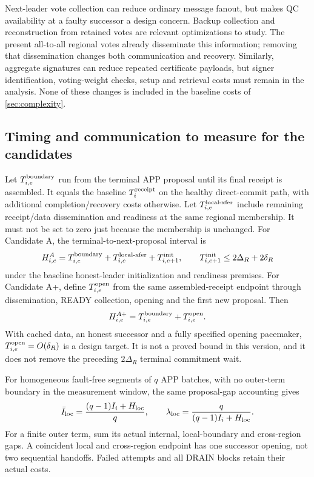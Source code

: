 Next-leader vote collection can reduce ordinary message fanout, but makes
QC availability at a faulty successor a design concern. Backup collection
and reconstruction from retained votes are relevant optimizations to study.
The present all-to-all regional votes already disseminate this information;
removing that dissemination changes both communication and recovery.
Similarly, aggregate signatures can reduce repeated certificate payloads,
but signer identification, voting-weight checks, setup and retrieval costs
must remain in the analysis. None of these changes is included in the
baseline costs of \cref{sec:complexity}.

\subsection{Timing and communication to measure for the candidates}
Let $T_{i,e}^{\rm boundary}$ run from the terminal APP proposal until its
final receipt is assembled. It equals the baseline $T_i^{\rm receipt}$ on
the healthy direct-commit path, with additional completion/recovery costs
otherwise. Let $T_{i,e}^{\rm local\text{-}xfer}$ include remaining receipt/data
dissemination and readiness at the same regional membership. It must not
be set to zero just because the membership is unchanged. For Candidate A,
the terminal-to-next-proposal interval is
\[
 H_{i,e}^{A}=T_{i,e}^{\rm boundary}
            +T_{i,e}^{\rm local\text{-}xfer}+T_{i,e+1}^{\rm init},
 \qquad T_{i,e+1}^{\rm init}\leq2\Delta_R+2\delta_R
\]
under the baseline honest-leader initialization and readiness premises.
For Candidate A+, define $T_{i,e}^{\rm open}$ from the same assembled-receipt
endpoint through dissemination, READY collection, opening and the first
new proposal. Then
\[
 H_{i,e}^{A+}=T_{i,e}^{\rm boundary}+T_{i,e}^{\rm open}.
\]
With cached data, an honest successor and a fully specified opening
pacemaker, $T_{i,e}^{\rm open}=O(\delta_R)$ is a design target. It is not a
proved bound in this version, and it does not remove the preceding
$2\Delta_R$ terminal commitment wait.

For homogeneous fault-free segments of $q$ APP batches, with no outer-term
boundary in the measurement window, the same proposal-gap accounting gives
\[
 \bar I_{\rm loc}=\frac{(q-1)I_i+H_{\rm loc}}{q},\qquad
 \lambda_{\rm loc}=\frac{q}{(q-1)I_i+H_{\rm loc}}.
\]
For a finite outer term, sum its actual internal, local-boundary and
cross-region gaps. A coincident local and cross-region endpoint has one
successor opening, not two sequential handoffs. Failed attempts and all
DRAIN blocks retain their actual costs.

